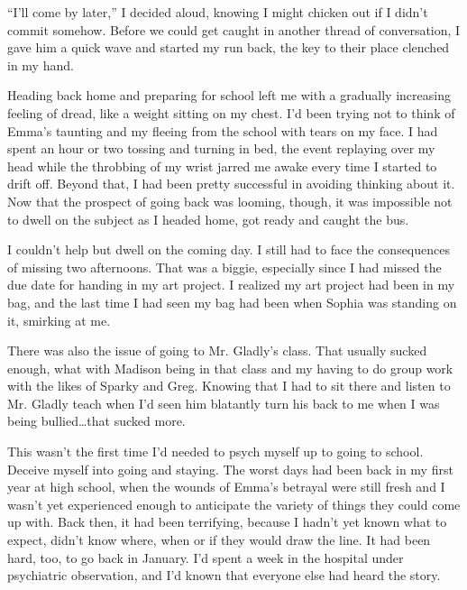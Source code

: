 ``I'll come by later,'' I decided aloud, knowing I might chicken out if I didn't commit somehow.  Before we could get caught in another thread of conversation, I gave him a quick wave and started my run back, the key to their place clenched in my hand.



Heading back home and preparing for school left me with a gradually increasing feeling of dread, like a weight sitting on my chest.  I'd been trying not to think of Emma's taunting and my fleeing from the school with tears on my face.  I had spent an hour or two tossing and turning in bed, the event replaying over my head while the throbbing of my wrist jarred me awake every time I started to drift off.  Beyond that, I had been pretty successful in avoiding thinking about it.  Now that the prospect of going back was looming, though, it was impossible not to dwell on the subject as I headed home, got ready and caught the bus.



I couldn't help but dwell on the coming day.  I still had to face the consequences of missing two afternoons.  That was a biggie, especially since I had missed the due date for handing in my art project.  I realized my art project had been in my bag, and the last time I had seen my bag had been when Sophia was standing on it, smirking at me.



There was also the issue of going to Mr. Gladly's class.  That usually sucked enough, what with Madison being in that class and my having to do group work with the likes of Sparky and Greg.  Knowing that I had to sit there and listen to Mr. Gladly teach when I'd seen him blatantly turn his back to me when I was being bullied\ldots that sucked more.



This wasn't the first time I'd needed to psych myself up to going to school.  Deceive myself into going and staying.  The worst days had been back in my first year at high school, when the wounds of Emma's betrayal were still fresh and I wasn't yet experienced enough to anticipate the variety of things they could come up with.  Back then, it had been terrifying, because I hadn't yet known what to expect, didn't know where, when or if they would draw the line.  It had been hard, too, to go back in January.  I'd spent a week in the hospital under psychiatric observation, and I'd known that everyone else had heard the story.



